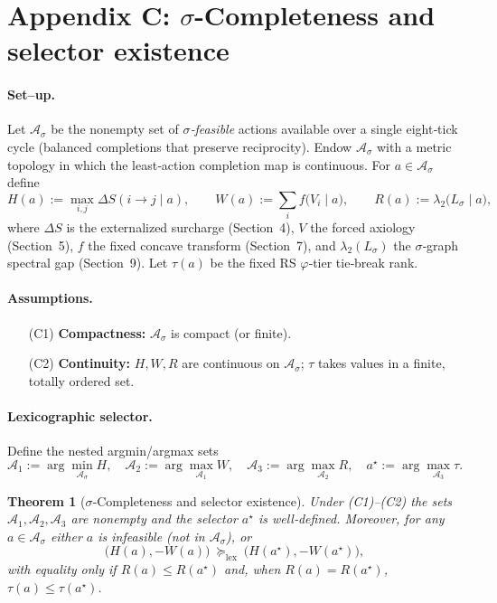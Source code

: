 \documentclass[11pt]{article}
\newtheorem{theorem}{Theorem}[section]
\begin{document}
\appendix

\section{Appendix C: $\sigma$-Completeness and selector existence}

\paragraph{Set–up.}
Let $\mathcal{A}_\sigma$ be the nonempty set of \emph{$\sigma$‑feasible} actions available over a single eight‑tick cycle (balanced completions that preserve reciprocity). Endow $\mathcal{A}_\sigma$ with a metric topology in which the least‑action completion map is continuous. For $a\in\mathcal{A}_\sigma$ define
\[
H(a):=\max_{i,j}\Delta S(i\!\to\! j\mid a),\qquad
W(a):=\sum_i f\!\big(V_i\mid a\big),\qquad
R(a):=\lambda_2\!\big(L_\sigma\mid a\big),
\]
where $\Delta S$ is the externalized surcharge (Section~4), $V$ the forced axiology (Section~5), $f$ the fixed concave transform (Section~7), and $\lambda_2(L_\sigma)$ the $\sigma$‑graph spectral gap (Section~9). Let $\tau(a)$ be the fixed RS $\varphi$‑tier tie‑break rank.

\paragraph{Assumptions.}
\begin{enumerate}
\item[(C1)] \textbf{Compactness:} $\mathcal{A}_\sigma$ is compact (or finite).
\item[(C2)] \textbf{Continuity:} $H,W,R$ are continuous on $\mathcal{A}_\sigma$; $\tau$ takes values in a finite, totally ordered set.
\end{enumerate}

\paragraph{Lexicographic selector.}
Define the nested argmin/argmax sets
\[
\mathcal{A}_1:=\arg\min_{\mathcal{A}_\sigma} H,\quad
\mathcal{A}_2:=\arg\max_{\mathcal{A}_1} W,\quad
\mathcal{A}_3:=\arg\max_{\mathcal{A}_2} R,\quad
a^\star:=\arg\max_{\mathcal{A}_3} \tau.
\]

\begin{theorem}[{$\sigma$‑Completeness and selector existence}]
Under \textup{(C1)–(C2)} the sets $\mathcal{A}_1,\mathcal{A}_2,\mathcal{A}_3$ are nonempty and the selector $a^\star$ is well‑defined. Moreover, for any $a\in\mathcal{A}_\sigma$ either $a$ is infeasible (not in $\mathcal{A}_\sigma$), or
\[
\big(H(a),-W(a)\big)\ \succeq_{\mathrm{lex}}\ \big(H(a^\star),-W(a^\star)\big),
\]
with equality only if $R(a)\le R(a^\star)$ and, when $R(a)=R(a^\star)$, $\tau(a)\le \tau(a^\star)$.
\end{theorem}
\end{document}
